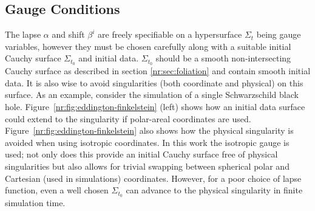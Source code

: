 \subsection{Gauge Conditions}\label{nr:sec:gaugeconditions}
The lapse $\alpha$ and shift $\beta^i$ are freely specifiable on a hypersurface $\Sigma_t$ being gauge variables, however they must be chosen carefully along with a suitable initial Cauchy surface $\Sigma_{t_0}$ and initial data. $\Sigma_{t_0}$ should be a smooth non-intersecting Cauchy surface as described in section \ref{nr:sec:foliation} and contain smooth initial data. It is also wise to avoid singularities (both coordinate and physical) on this surface. As an example, consider the simulation of a single Schwarzschild black hole. Figure~\ref{nr:fig:eddington-finkelstein} (left) shows how an initial data surface could extend to the singularity if polar-areal coordinates are used. Figure~\ref{nr:fig:eddington-finkelstein} also shows how the physical singularity is avoided when using isotropic coordinates. In this work the isotropic gauge is used; not only does this provide an initial Cauchy surface free of physical singularities but also allows for trivial swapping between spherical polar and Cartesian (used in simulations) coordinates. However, for a poor choice of lapse function, even a well chosen $\Sigma_{t_0}$ can advance to the physical singularity in finite simulation time. 


